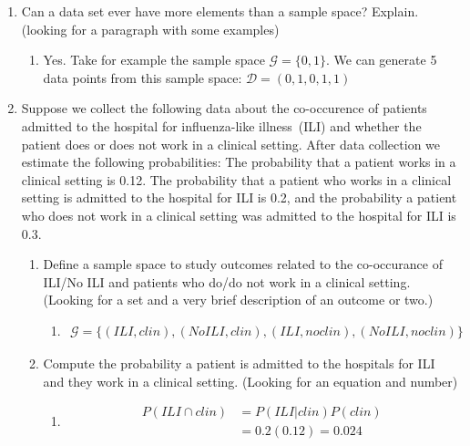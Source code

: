 \documentclass[krantz1,ChapterTOCs]{krantz}
\begin{document}
\begin{enumerate}
\begin{enumerate}
\begin{enumerate}
{       \end{enumerate}
   \end{enumerate}
    
   \item Can a data set ever have more elements than a sample space? Explain. (looking for a paragraph with some examples)
   \begin{enumerate}
           \item {\color{red}  Yes. Take  for example the sample space $\mathcal{G} = \{0,1\}$. We can generate 5 data points from this sample space: $
           \mathcal{D} = (0,1,0,1,1)$   }
       \end{enumerate}
   
   \item Suppose we collect the following data about the co-occurence of patients admitted to the hospital for influenza-like illness~(ILI) and whether the patient does or does not work in a clinical setting. 
   After data collection we estimate the following probabilities: The probability that a patient works in a clinical setting is 0.12. The probability that a patient who works in a clinical setting is admitted to the hospital for ILI is 0.2, and the probability a patient who does not work in a clinical setting was admitted to the hospital for ILI is 0.3. 
   \begin{enumerate}
       \item Define a sample space to study outcomes related to the co-occurance of ILI/No ILI and patients who do/do not work in a clinical setting. (Looking for a set and a very brief description of an outcome or two.) 
       
       \begin{enumerate}
           \item {\color{red} \begin{align*}
                      \mathcal{G} = \{  (ILI,clin),(No ILI,clin) ,(ILI, no clin), (No ILI, no clin)   \}
                 \end{align*}
                 }
       \end{enumerate}
       
       \item Compute the probability a patient is admitted to the hospitals for ILI and they work in a clinical setting. (Looking for an equation and number)
       
       \begin{enumerate}
           \item {\color{red} 
               \begin{align*}
                    P(ILI \cap clin) &= P(ILI | clin)P(clin)\\
                                     &= 0.2 (0.12) = 0.024
               \end{align*}}
        \end{enumerate}
           

\end{enumerate}
\end{enumerate}
\end{document}
